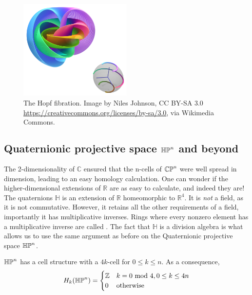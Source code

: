 \begin{figure}[h!]
    \centering
    \captionsetup{width=.7\linewidth}
    \includegraphics[width=0.5\textwidth]{hopf-fibration.png}
    \caption{The Hopf fibration. Image by Niles Johnson, CC BY-SA 3.0 \url{https://creativecommons.org/licenses/by-sa/3.0}, via Wikimedia Commons.}
    \label{hopf-fig}
\end{figure}
\subsection{Quaternionic projective space $\mathbb{HP}^{n}$ and beyond}
The 2-dimensionality of $\mathbb{C}$ ensured that the n-cells of $\mathbb{CP}^{n}$ were well spread in dimension, leading to an easy homology calculation. One can wonder if the higher-dimensional extensions of $\mathbb{R}$ are as easy to calculate, and indeed they are! The quaternions $\mathbb{H}$ is an extension of $\mathbb{R}$ homeomorphic to $\mathbb{R}^4$. It is \textit{not} a field, as it is not commutative. However, it retains all the other requirements of a field, importantly it has multiplicative inverses. Rings where every nonzero element has a multiplicative inverse are called . The fact that $\mathbb{H}$ is a division algebra is what allows us to use the same argument as before on the Quaternionic projective space $\mathbb{HP}^{n}$.

\begin{prop}
$\mathbb{HP}^{n}$ has a cell structure with a $4k$-cell for $0\leq k\leq n$. As a consequence, $$H_k(\mathbb{HP}^{n})=\begin{cases}\mathbb{Z} & k=0\text{ mod } 4 , 0\leq k\leq 4n \\ 0 & \text{otherwise}\end{cases}$$
\end{prop}

